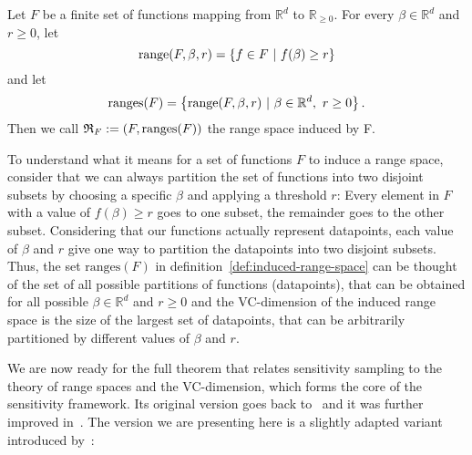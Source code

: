 \begin{definition}
    \label{def:induced-range-space}
    Let $F$ be a finite set of functions mapping from $\mathbb{R}^d$ to
    $\mathbb{R}_{\geq 0}$.
    For every $\beta \in \mathbb{R}^d$ and $r \geq 0$, let
    \begin{equation*}
        \textup{range}(F, \beta, r) = \left\{ f \in F \ | \  f(\beta) \geq r  \right\}
    \end{equation*}
    and let
    \begin{equation*}
        \textup{ranges}(F) = \left\{ \textup{range}(F, \beta, r) \ | \ \beta \in \mathbb{R}^d, \ r \geq 0  \right\}.
    \end{equation*}
    Then we call $\mathfrak{R}_F := (F, \textup{ranges}(F))$ the range space induced by F.
\end{definition}

To understand what it means for a set of functions $F$ to induce
a range space, consider that we can always partition the set
of functions into two disjoint subsets by choosing
a specific $\beta$ and applying a threshold $r$:
Every element in $F$ with a value of $f(\beta) \geq r$ goes to
one subset, the remainder goes to the other subset.
Considering that our functions actually represent datapoints,
each value of $\beta$ and $r$ give one way to partition the
datapoints into two disjoint subsets.
Thus, the set $\text{ranges}(F)$ in definition~\ref{def:induced-range-space}
can be thought of the set of all possible partitions of
functions (datapoints), that can be obtained for all
possible $\beta \in \mathbb{R}^d$ and $r \geq 0$ and the
VC-dimension of the induced range space is the size of the
largest set of datapoints, that can be arbitrarily partitioned
by different values of $\beta$ and $r$.

We are now ready for the full theorem that relates sensitivity sampling
to the theory of range spaces and the VC-dimension, which forms
the core of the sensitivity framework.
Its original version goes back to~\cite{feldman-langberg-coresets}
and it was further improved in~\cite{braverman-feldman-coresets}.
The version we are presenting here is a slightly
adapted variant introduced by~\cite{big-data-tiny-data}:

